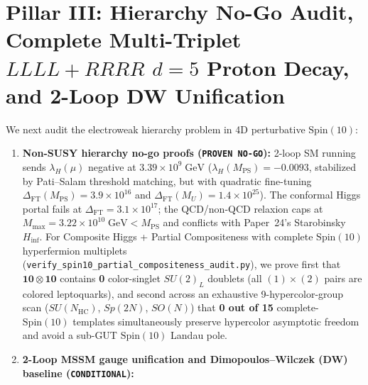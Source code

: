 \documentclass[11pt,a4paper]{article}
\begin{document}
\section{\texorpdfstring{Pillar III: Hierarchy No-Go Audit, Complete Multi-Triplet $LLLL+RRRR$ $d=5$ Proton Decay, and 2-Loop DW Unification}{Pillar III: Hierarchy No-Go Audit, Complete Multi-Triplet LLLL+RRRR d=5 Proton Decay, and 2-Loop DW Unification}}
We next audit the electroweak hierarchy problem in 4D perturbative $\mathrm{Spin}(10)$:
\begin{enumerate}
    \item \textbf{Non-SUSY hierarchy no-go proofs (\texttt{PROVEN NO-GO}):} 2-loop SM running sends $\lambda_H(\mu)$ negative at $3.39\times 10^9\;\mathrm{GeV}$ ($\lambda_H(M_{\mathrm{PS}}) = -0.0093$, stabilized by Pati--Salam threshold matching, but with quadratic fine-tuning $\Delta_{\mathrm{FT}}(M_{\mathrm{PS}}) = 3.9\times 10^{16}$ and $\Delta_{\mathrm{FT}}(M_U) = 1.4\times 10^{25}$). The conformal Higgs portal fails at $\Delta_{\mathrm{FT}} = 3.1\times 10^{17}$; the QCD/non-QCD relaxion caps at $M_{\max} = 3.22\times 10^{10}\;\mathrm{GeV} < M_{\mathrm{PS}}$ and conflicts with Paper~24's Starobinsky $H_{\mathrm{inf}}$. For Composite Higgs + Partial Compositeness with complete $\mathrm{Spin}(10)$ hyperfermion multiplets (\texttt{verify\_spin10\_partial\_compositeness\_audit.py}), we prove first that $\mathbf{10}\otimes\mathbf{10}$ contains \textbf{0} color-singlet $SU(2)_L$ doublets (all $(1)\times(2)$ pairs are colored leptoquarks), and second across an exhaustive 9-hypercolor-group scan ($SU(N_{\mathrm{HC}})$, $Sp(2N)$, $SO(N)$) that \textbf{0 out of 15} complete-$\mathrm{Spin}(10)$ templates simultaneously preserve hypercolor asymptotic freedom and avoid a sub-GUT $\mathrm{Spin}(10)$ Landau pole.
    \item \textbf{2-Loop MSSM gauge unification and Dimopoulos--Wilczek (DW) baseline (\texttt{CONDITIONAL}):}

\end{enumerate}
\end{document}
